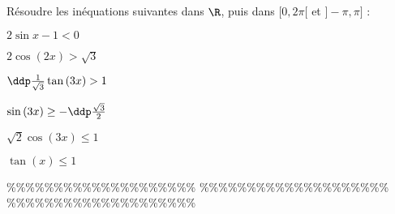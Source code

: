 



\begin{exercice}   \;
R\'esoudre les in\'equations suivantes dans $\R$, puis dans $\lbrack 0,2\pi\lbrack$ et $\rbrack -\pi,\pi\rbrack$ :
\begin{enumerate}
\begin{minipage}[t]{0.45\textwidth}
\item $2\sin{x}-1<0$
\item $2\cos{(2x)}>\sqrt{3}$
\item $\ddp\frac{1}{\sqrt{3}}\tan{(3x)}>1$
\end{minipage}
\begin{minipage}[t]{0.45\textwidth}
\item $\sin{(3x)}\geq -\ddp\frac{\sqrt{3}}{2}$
\item $\sqrt{2}\cos{(3x)}\leq 1$
\item $\tan{(x)}\leq 1$
\end{minipage}
\end{enumerate}
\end{exercice}


\%\%\%\%\%\%\%\%\%\%\%\%\%\%\%\%\%\%\%\%
\%\%\%\%\%\%\%\%\%\%\%\%\%\%\%\%\%\%\%\%
\%\%\%\%\%\%\%\%\%\%\%\%\%\%\%\%\%\%\%\%




